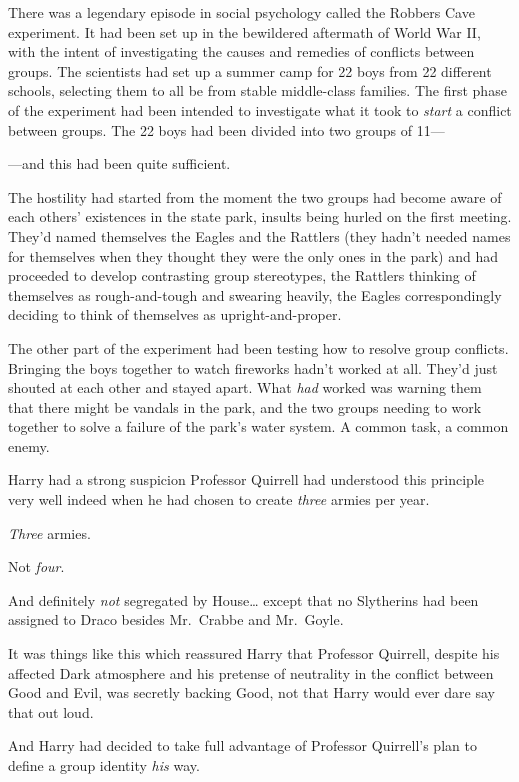 There was a legendary episode in social psychology called the Robbers Cave experiment. It had been set up in the bewildered aftermath of World War II, with the intent of investigating the causes and remedies of conflicts between groups. The scientists had set up a summer camp for 22 boys from 22 different schools, selecting them to all be from stable middle-class families. The first phase of the experiment had been intended to investigate what it took to \emph{start} a conflict between groups. The 22 boys had been divided into two groups of 11---

---and this had been quite sufficient.

The hostility had started from the moment the two groups had become aware of each others' existences in the state park, insults being hurled on the first meeting. They'd named themselves the Eagles and the Rattlers (they hadn't needed names for themselves when they thought they were the only ones in the park) and had proceeded to develop contrasting group stereotypes, the Rattlers thinking of themselves as rough-and-tough and swearing heavily, the Eagles correspondingly deciding to think of themselves as upright-and-proper.

The other part of the experiment had been testing how to resolve group conflicts. Bringing the boys together to watch fireworks hadn't worked at all. They'd just shouted at each other and stayed apart. What \emph{had} worked was warning them that there might be vandals in the park, and the two groups needing to work together to solve a failure of the park's water system. A common task, a common enemy.

Harry had a strong suspicion Professor Quirrell had understood this principle very well indeed when he had chosen to create \emph{three} armies per year.

\emph{Three} armies.

Not \emph{four}.

And definitely \emph{not} segregated by House{\ldots} except that no Slytherins had been assigned to Draco besides Mr.~Crabbe and Mr.~Goyle.

It was things like this which reassured Harry that Professor Quirrell, despite his affected Dark atmosphere and his pretense of neutrality in the conflict between Good and Evil, was secretly backing Good, not that Harry would ever dare say that out loud.

And Harry had decided to take full advantage of Professor Quirrell's plan to define a group identity \emph{his} way.

